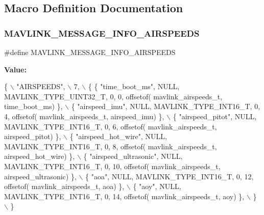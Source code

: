 \subsection{Macro Definition Documentation}
\mbox{\label{mavlink__msg__airspeeds_8h_ae09b48c8921d312b5f37b1527baaea9e}} 
\subsubsection{M\+A\+V\+L\+I\+N\+K\+\_\+\+M\+E\+S\+S\+A\+G\+E\+\_\+\+I\+N\+F\+O\+\_\+\+A\+I\+R\+S\+P\+E\+E\+DS}
{\footnotesize\ttfamily \#define M\+A\+V\+L\+I\+N\+K\+\_\+\+M\+E\+S\+S\+A\+G\+E\+\_\+\+I\+N\+F\+O\+\_\+\+A\+I\+R\+S\+P\+E\+E\+DS}

{\bfseries Value\+:}
\begin{DoxyCode}
\{ \(\backslash\)
    \textcolor{stringliteral}{"AIRSPEEDS"}, \(\backslash\)
    7, \(\backslash\)
    \{  \{ \textcolor{stringliteral}{"time\_boot\_ms"}, NULL, MAVLINK_TYPE_UINT32_T, 0, 0, offsetof(
      mavlink_airspeeds_t, time\_boot\_ms) \}, \(\backslash\)
         \{ \textcolor{stringliteral}{"airspeed\_imu"}, NULL, MAVLINK_TYPE_INT16_T, 0, 4, offsetof(
      mavlink_airspeeds_t, airspeed\_imu) \}, \(\backslash\)
         \{ \textcolor{stringliteral}{"airspeed\_pitot"}, NULL, MAVLINK_TYPE_INT16_T, 0, 6, offsetof(
      mavlink_airspeeds_t, airspeed\_pitot) \}, \(\backslash\)
         \{ \textcolor{stringliteral}{"airspeed\_hot\_wire"}, NULL, MAVLINK_TYPE_INT16_T, 0, 8, offsetof(
      mavlink_airspeeds_t, airspeed\_hot\_wire) \}, \(\backslash\)
         \{ \textcolor{stringliteral}{"airspeed\_ultrasonic"}, NULL, MAVLINK_TYPE_INT16_T, 0, 10, offsetof(
      mavlink_airspeeds_t, airspeed\_ultrasonic) \}, \(\backslash\)
         \{ \textcolor{stringliteral}{"aoa"}, NULL, MAVLINK_TYPE_INT16_T, 0, 12, offsetof(
      mavlink_airspeeds_t, aoa) \}, \(\backslash\)
         \{ \textcolor{stringliteral}{"aoy"}, NULL, MAVLINK_TYPE_INT16_T, 0, 14, offsetof(
      mavlink_airspeeds_t, aoy) \}, \(\backslash\)
         \} \(\backslash\)
\}
\end{DoxyCode}
\mbox{\label{mavlink__msg__airspeeds_8h_a697ea2c6889dca391fee17eb52dd4ad4}} 
